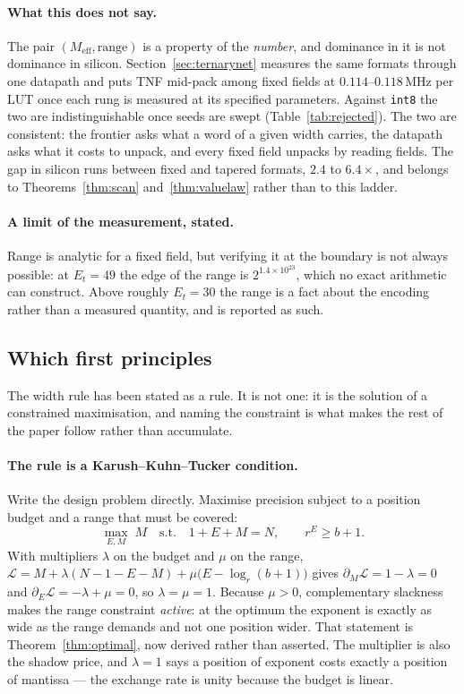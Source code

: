 \documentclass[11pt]{article}
\theoremstyle{definition}
\begin{document}
\paragraph{What this does not say.} The pair $(M_{\mathrm{eff}}, \text{range})$ is
a property of the \emph{number}, and dominance in it is not dominance in silicon.
Section~\ref{sec:ternarynet} measures the same formats through one datapath and
puts TNF mid-pack among fixed fields at $0.114$--$0.118$\,MHz per LUT once
each rung is measured at its specified parameters. Against
\texttt{int8} the two are indistinguishable once seeds are swept
(Table~\ref{tab:rejected}). The two are consistent: the frontier asks what a word of
a given width carries, the datapath asks what it costs to unpack, and every fixed
field unpacks by reading fields. The gap in silicon runs between fixed and tapered
formats, $2.4$ to $6.4\times$, and belongs to Theorems~\ref{thm:scan}
and~\ref{thm:valuelaw} rather than to this ladder.

\paragraph{A limit of the measurement, stated.} Range is analytic for a fixed
field, but verifying it at the boundary is not always possible: at $E_t = 49$ the
edge of the range is $2^{1.4 \times 10^{23}}$, which no exact arithmetic can
construct. Above roughly $E_t = 30$ the range is a fact about the encoding rather
than a measured quantity, and is reported as such.





\subsection{Which first principles}
\label{sec:principles}

The width rule has been stated as a rule. It is not one: it is the solution of a
constrained maximisation, and naming the constraint is what makes the rest of the
paper follow rather than accumulate.

\paragraph{The rule is a Karush--Kuhn--Tucker condition.} Write the design problem
directly. Maximise precision subject to a position budget and a range that must be
covered:
\[
  \max_{E,M} \; M
  \quad\text{s.t.}\quad
  1 + E + M = N,
  \qquad
  r^{E} \ge b+1 .
\]
With multipliers $\lambda$ on the budget and $\mu$ on the range,
$\mathcal{L} = M + \lambda(N-1-E-M) + \mu\bigl(E - \log_r(b+1)\bigr)$ gives
$\partial_M \mathcal{L} = 1-\lambda = 0$ and $\partial_E \mathcal{L} = -\lambda+\mu = 0$,
so $\lambda = \mu = 1$. Because $\mu > 0$, complementary slackness makes the range
constraint \emph{active}: at the optimum the exponent is exactly as wide as the
range demands and not one position wider. That statement is
Theorem~\ref{thm:optimal}, now derived rather than asserted. The multiplier is
also the shadow price, and $\lambda = 1$ says a position of exponent costs exactly
a position of mantissa --- the exchange rate is unity because the budget is linear.
\end{document}
